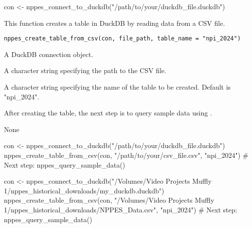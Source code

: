 \documentclass[a4paper]{book}
\begin{document}
%
\begin{Examples}
\begin{ExampleCode}
con <- nppes_connect_to_duckdb("/path/to/your/duckdb_file.duckdb")
\end{ExampleCode}
\end{Examples}
%
\begin{Description}
This function creates a table in DuckDB by reading data from a CSV file.
\end{Description}
%
\begin{Usage}
\begin{verbatim}
nppes_create_table_from_csv(con, file_path, table_name = "npi_2024")
\end{verbatim}
\end{Usage}
%
\begin{Arguments}
\begin{ldescription}
\item[\code{con}] A DuckDB connection object.

\item[\code{file\_path}] A character string specifying the path to the CSV file.

\item[\code{table\_name}] A character string specifying the name of the table to be created. Default is "npi\_2024".
\end{ldescription}
\end{Arguments}
%
\begin{Details}
After creating the table, the next step is to query sample data using .
\end{Details}
%
\begin{Value}
None
\end{Value}
%
\begin{Examples}
\begin{ExampleCode}
con <- nppes_connect_to_duckdb("/path/to/your/duckdb_file.duckdb")
nppes_create_table_from_csv(con, "/path/to/your/csv_file.csv", "npi_2024")
# Next step: nppes_query_sample_data()

con <- nppes_connect_to_duckdb("/Volumes/Video Projects Muffly 1/nppes_historical_downloads/my_duckdb.duckdb")
nppes_create_table_from_csv(con, "/Volumes/Video Projects Muffly 1/nppes_historical_downloads/NPPES_Data.csv", "npi_2024")
# Next step: nppes_query_sample_data()
\end{ExampleCode}
\end{Examples}
\end{document}
